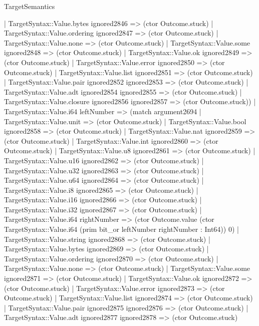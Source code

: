 \begin{lexlean}{TargetSemantics}
\begin{semanticmodule}
{              | TargetSyntax::Value.bytes ignored2846 => (ctor Outcome.stuck)
              | TargetSyntax::Value.ordering ignored2847 => (ctor Outcome.stuck)
              | TargetSyntax::Value.none => (ctor Outcome.stuck)
              | TargetSyntax::Value.some ignored2848 => (ctor Outcome.stuck)
              | TargetSyntax::Value.ok ignored2849 => (ctor Outcome.stuck)
              | TargetSyntax::Value.error ignored2850 => (ctor Outcome.stuck)
              | TargetSyntax::Value.list ignored2851 => (ctor Outcome.stuck)
              | TargetSyntax::Value.pair ignored2852 ignored2853 => (ctor Outcome.stuck)
              | TargetSyntax::Value.adt ignored2854 ignored2855 => (ctor Outcome.stuck)
              | TargetSyntax::Value.closure ignored2856 ignored2857 => (ctor Outcome.stuck))
            | TargetSyntax::Value.i64 leftNumber => (match argument2694
              | TargetSyntax::Value.unit => (ctor Outcome.stuck)
              | TargetSyntax::Value.bool ignored2858 => (ctor Outcome.stuck)
              | TargetSyntax::Value.nat ignored2859 => (ctor Outcome.stuck)
              | TargetSyntax::Value.int ignored2860 => (ctor Outcome.stuck)
              | TargetSyntax::Value.u8 ignored2861 => (ctor Outcome.stuck)
              | TargetSyntax::Value.u16 ignored2862 => (ctor Outcome.stuck)
              | TargetSyntax::Value.u32 ignored2863 => (ctor Outcome.stuck)
              | TargetSyntax::Value.u64 ignored2864 => (ctor Outcome.stuck)
              | TargetSyntax::Value.i8 ignored2865 => (ctor Outcome.stuck)
              | TargetSyntax::Value.i16 ignored2866 => (ctor Outcome.stuck)
              | TargetSyntax::Value.i32 ignored2867 => (ctor Outcome.stuck)
              | TargetSyntax::Value.i64 rightNumber => (ctor Outcome.value (ctor TargetSyntax::Value.i64 (prim bit_or leftNumber rightNumber : Int64)) 0)
              | TargetSyntax::Value.string ignored2868 => (ctor Outcome.stuck)
              | TargetSyntax::Value.bytes ignored2869 => (ctor Outcome.stuck)
              | TargetSyntax::Value.ordering ignored2870 => (ctor Outcome.stuck)
              | TargetSyntax::Value.none => (ctor Outcome.stuck)
              | TargetSyntax::Value.some ignored2871 => (ctor Outcome.stuck)
              | TargetSyntax::Value.ok ignored2872 => (ctor Outcome.stuck)
              | TargetSyntax::Value.error ignored2873 => (ctor Outcome.stuck)
              | TargetSyntax::Value.list ignored2874 => (ctor Outcome.stuck)
              | TargetSyntax::Value.pair ignored2875 ignored2876 => (ctor Outcome.stuck)
              | TargetSyntax::Value.adt ignored2877 ignored2878 => (ctor Outcome.stuck)
}
\end{semanticmodule}
\end{lexlean}
